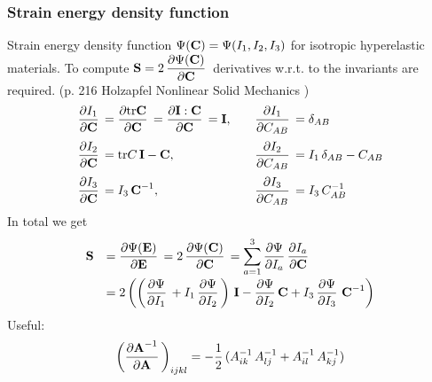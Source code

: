 \subsubsection{Strain energy density function}
Strain energy density function $\Psi(\textbf{C}) = \Psi(I_1, I_2, I_3)$ for isotropic hyperelastic materials. To compute $\bfS = 2\,\p{\Psi(\bfC)}{\bfC}$ derivatives w.r.t. to the invariants are required. (p. 216 Holzapfel Nonlinear Solid Mechanics  \cite{holzapfel2000nonlinear})
\begin{equation*}
  \begin{array}{lll}
    \p{I_1}{\bfC} = \p{\tr\bfC}{\bfC} = \p{\bfI:\bfC}{\bfC} = \bfI, \quad &\p{I_1}{C_{AB}} = \delta_{AB}\\[4mm]
    \p{I_2}{\bfC} = \tr C\,\bfI - \bfC, \quad &\p{I_2}{C_{AB}} = I_1\,\delta_{AB} - C_{AB}\\[4mm]
    \p{I_3}{\bfC} = I_3\,\bfC^{-1}, \quad &\p{I_3}{C_{AB}} = I_3\,C^{-1}_{AB}
  \end{array}
\end{equation*}
In total we get
\begin{equation*}
  \begin{array}{lll}
    \bfS &=  \p{\Psi(\bfE)}{\bfE} = 2\,\p{\Psi(\bfC)}{\bfC} = \ds\s{a=1}{3}\p{\Psi}{I_a}\p{I_a}{\bfC}\\[4mm]
     &= 2\left(\left(\p{\Psi}{I_1} + I_1\,\p{\Psi}{I_2}\right)\,\bfI - \p{\Psi}{I_2}\bfC + I_3\,\p{\Psi}{I_3} \,\bfC^{-1}\right)
  \end{array}
\end{equation*}
Useful:
\begin{equation*}
  \begin{array}{lll}
    \left( \p{\bfA^{-1}}{\bfA} \right)_{ijkl} = -\dfrac12(A^{-1}_{ik}\,A^{-1}_{lj} + A^{-1}_{il}\,A^{-1}_{kj})
  \end{array}
\end{equation*}
